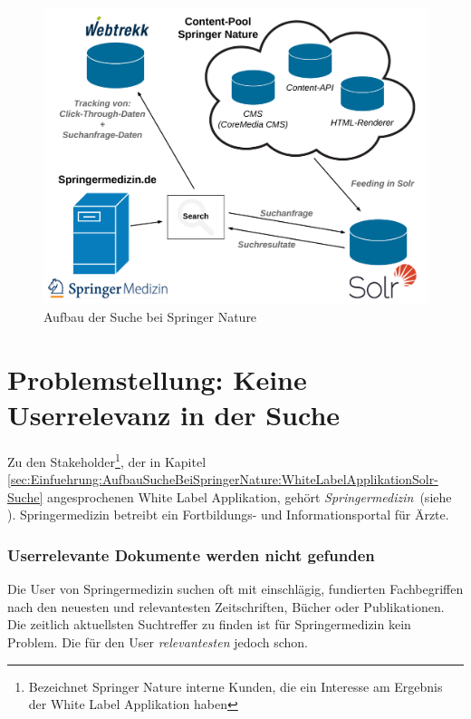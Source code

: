\begin{figure}[H]
\centering
\vspace{-1.25em}
\caption[Aufbau der Suche bei Springer Nature]{Aufbau der Suche bei Springer Nature}
\vspace{.5em}
\label{fig:SucheSpringerNature}
\includegraphics[width=0.7\linewidth]{gfx/AufbauSucheSpringerNature}
\vspace{-2em}
\end{figure}


\section{Problemstellung: Keine Userrelevanz in der Suche}
\label{sec:Einfuehrung:Problemstellung}

Zu den Stakeholder\footnote{Bezeichnet Springer Nature interne Kunden, die ein Interesse am Ergebnis der White Label Applikation haben}, der in Kapitel \ref{sec:Einfuehrung:AufbauSucheBeiSpringerNature:WhiteLabelApplikationSolr-Suche} angesprochenen White Label Applikation, gehört \textit{Springermedizin}~(siehe \cite{SMED}). Springermedizin betreibt ein Fortbildungs- und Informationsportal für Ärzte.

\subsubsection{Userrelevante Dokumente werden nicht gefunden}
\label{sec:Einfuehrung:Problemstellung:Userrelevanz}

Die User von Springermedizin suchen oft mit einschlägig, fundierten Fachbegriffen nach den neuesten und relevantesten Zeitschriften, Bücher oder Publikationen. Die zeitlich aktuellsten Suchtreffer zu finden ist für Springermedizin kein Problem. Die für den User \textit{relevantesten} jedoch schon.

